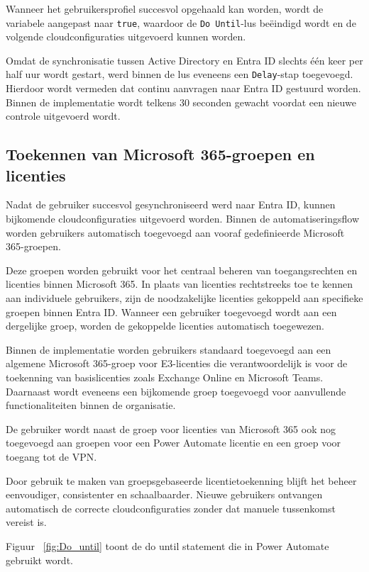 Wanneer het gebruikersprofiel succesvol opgehaald kan worden, wordt de variabele aangepast naar \texttt{true}, waardoor de \texttt{Do Until}-lus beëindigd wordt en de volgende cloudconfiguraties uitgevoerd kunnen worden.

Omdat de synchronisatie tussen Active Directory en Entra ID slechts één keer per half uur wordt gestart, werd binnen de lus eveneens een \texttt{Delay}-stap toegevoegd. Hierdoor wordt vermeden dat continu aanvragen naar Entra ID gestuurd worden. Binnen de implementatie wordt telkens 30 seconden gewacht voordat een nieuwe controle uitgevoerd wordt.

\subsection{Toekennen van Microsoft 365-groepen en licenties}

Nadat de gebruiker succesvol gesynchroniseerd werd naar Entra ID, kunnen bijkomende cloudconfiguraties uitgevoerd worden. Binnen de automatiseringsflow worden gebruikers automatisch toegevoegd aan vooraf gedefinieerde Microsoft 365-groepen.

Deze groepen worden gebruikt voor het centraal beheren van toegangsrechten en licenties binnen Microsoft 365. In plaats van licenties rechtstreeks toe te kennen aan individuele gebruikers, zijn de noodzakelijke licenties gekoppeld aan specifieke groepen binnen Entra ID. Wanneer een gebruiker toegevoegd wordt aan een dergelijke groep, worden de gekoppelde licenties automatisch toegewezen.

Binnen de implementatie worden gebruikers standaard toegevoegd aan een algemene Microsoft 365-groep voor E3-licenties die verantwoordelijk is voor de toekenning van basislicenties zoals Exchange Online en Microsoft Teams. Daarnaast wordt eveneens een bijkomende groep toegevoegd voor aanvullende functionaliteiten binnen de organisatie.

De gebruiker wordt naast de groep voor licenties van Microsoft 365 ook nog toegevoegd aan groepen voor een Power Automate licentie en een groep voor toegang tot de VPN. 

Door gebruik te maken van groepsgebaseerde licentietoekenning blijft het beheer eenvoudiger, consistenter en schaalbaarder. Nieuwe gebruikers ontvangen automatisch de correcte cloudconfiguraties zonder dat manuele tussenkomst vereist is.

Figuur ~\ref{fig:Do_until} toont de do until statement die in Power Automate gebruikt wordt.

